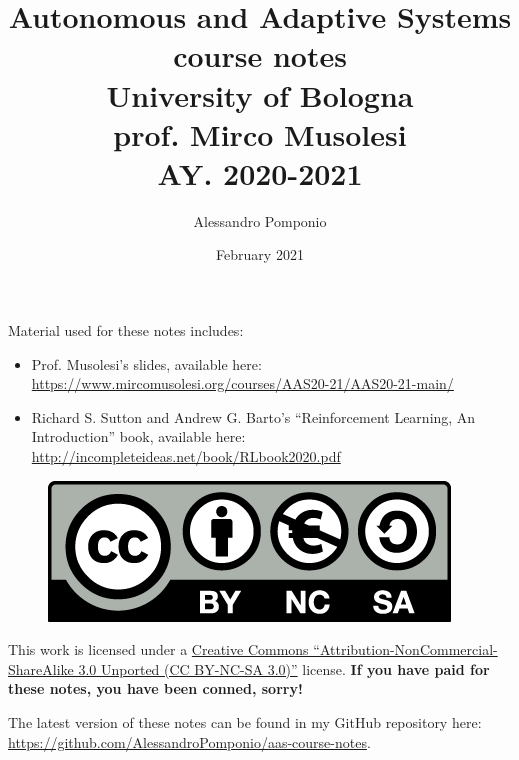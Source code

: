 \documentclass[12pt]{article}
\title{Autonomous and Adaptive Systems \\
        course notes\\
        University of Bologna \\
        \large	 prof. Mirco Musolesi \\
        AY. 2020-2021}
\author{Alessandro Pomponio}
\date{February 2021}
\begin{document}
\maketitle
\clearpage

Material used for these notes includes:
\begin{itemize}
    \item Prof. Musolesi's slides, available here: \url{https://www.mircomusolesi.org/courses/AAS20-21/AAS20-21-main/}
    \item Richard S. Sutton and Andrew G. Barto's ``Reinforcement Learning, An Introduction'' book, available here: \url{http://incompleteideas.net/book/RLbook2020.pdf}
\end{itemize}

\begin{figure}
\centering
\includegraphics[width=.9\linewidth]{Images/by-nc-sa.eu.png}
\end{figure}

This work is licensed under a \href{https://creativecommons.org/licenses/by-nc-sa/3.0/}{Creative Commons ``Attribution-NonCommercial-ShareAlike 3.0 Unported (CC BY-NC-SA 3.0)''} license. \textbf{If you have paid for these notes, you have been conned, sorry!}

The latest version of these notes can be found in my GitHub repository here: \url{https://github.com/AlessandroPomponio/aas-course-notes}.

\clearpage




\clearpage
\printbibliography
\end{document}
